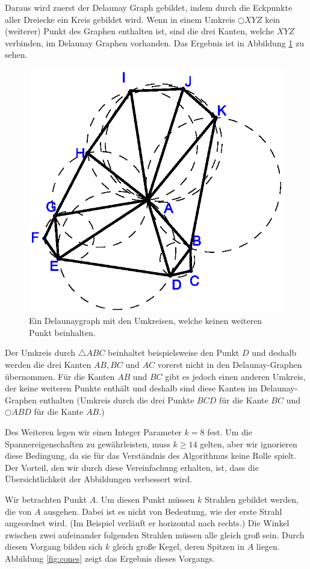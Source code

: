 \documentclass[a4paper,twoside]{IEEEtran}
\begin{document}
Daraus wird zuerst der Delaunay Graph gebildet, indem durch die Eckpunkte aller Dreiecke ein Kreis gebildet wird.
Wenn in einem Umkreis $\bigcirc{XYZ} $ kein (weiterer) Punkt des Graphen enthalten ist, sind die drei Kanten, welche $XYZ $ verbinden, im Delaunay Graphen vorhanden.
Das Ergebnis ist in Abbildung \ref{fig:delaunay} zu sehen.

\begin{figure}[h!]
\centering
\includegraphics[width=0.7\linewidth]{Delaunay_Graph.eps}
\caption{Ein Delaunaygraph mit den Umkreisen, welche keinen weiteren Punkt beinhalten.}
\label{fig:delaunay}
\end{figure}

Der Umkreis durch $\triangle{ABC} $ beinhaltet beispielsweise den Punkt $D $ und deshalb werden die drei Kanten $AB, BC $ und $AC $ vorerst nicht in den Delaunay-Graphen übernommen.
Für die Kanten $AB $ und $BC $ gibt es jedoch einen anderen Umkreis, der keine weiteren Punkte enthält und deshalb sind diese Kanten im Delaunay-Graphen enthalten (Umkreis durch die drei Punkte $BCD $ für die Kante $BC $ und  $\bigcirc{ABD} $ für die Kante $AB $.)

Des Weiteren legen wir einen Integer Parameter $k=8 $ fest.
Um die Spannereigenschaften zu gewährleisten, muss $k \geq 14 $ gelten, aber wir ignorieren diese Bedingung, da sie für das Verständnis des Algorithmus keine Rolle spielt.
Der Vorteil, den wir durch diese Vereinfachung erhalten, ist, dass die Übersichtlichkeit der Abbildungen verbessert wird.

Wir betrachten Punkt $A $.
Um diesen Punkt müssen $k $ Strahlen gebildet werden, die von $A $ ausgehen.
Dabei ist es nicht von Bedeutung, wie der erste Strahl angeordnet wird. (Im Beispiel verläuft er horizontal nach rechts.)
Die Winkel zwischen zwei aufeinander folgenden Strahlen müssen alle gleich groß sein.
Durch diesen Vorgang bilden sich $k $ gleich große Kegel, deren Spitzen in $A $ liegen.
Abbildung \ref{fig:cones} zeigt das Ergebnis dieses Vorgangs.
\end{document}
